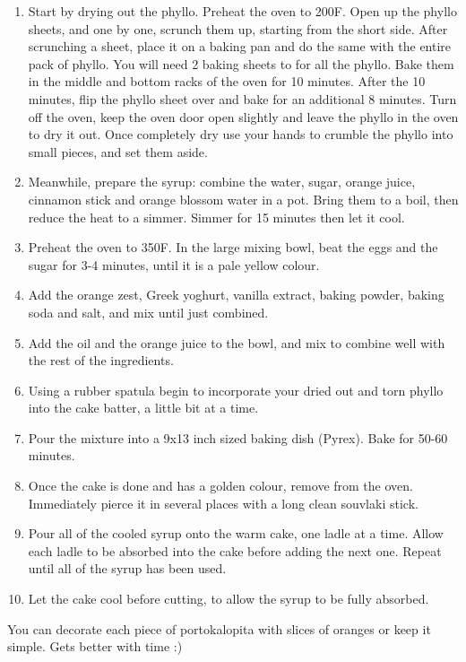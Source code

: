 \begin{enumerate}
    \item Start by drying out the phyllo. Preheat the oven to 200\degree F. Open up the phyllo sheets, and one by one, scrunch them up, starting from the short side. After scrunching a sheet, place it on a baking pan and do the same with the entire pack of phyllo. You will need 2 baking sheets to for all the phyllo. Bake them in the middle and bottom racks of the oven for 10 minutes. After the 10 minutes, flip the phyllo sheet over and bake for an additional 8 minutes. Turn off the oven, keep the oven door open slightly and leave the phyllo in the oven to dry it out. Once completely dry use your hands to crumble the phyllo into small pieces, and set them aside.
    \item Meanwhile, prepare the syrup: combine the water, sugar, orange juice, cinnamon stick and orange blossom water in a pot. Bring them to a boil, then reduce the heat to a simmer. Simmer for 15 minutes then let it cool.
    \item Preheat the oven to 350\degree F. In the large mixing bowl, beat the eggs and the sugar for 3-4 minutes, until it is a pale yellow colour.
    \item Add the orange zest, Greek yoghurt, vanilla extract, baking powder, baking soda and salt, and mix until just combined.
    \item Add the oil and the orange juice to the bowl, and mix to combine well with the rest of the ingredients.
    \item Using a rubber spatula begin to incorporate your dried out and torn phyllo into the cake batter, a little bit at a time.
    \item Pour the mixture into a 9x13 inch sized baking dish (Pyrex). Bake for 50-60 minutes.
    \item Once the cake is done and has a golden colour, remove from the oven. Immediately pierce it in several places with a long clean souvlaki stick.
    \item Pour all of the cooled syrup onto the warm cake, one ladle at a time. Allow each ladle to be absorbed into the cake before adding the next one. Repeat until all of the syrup has been used.
    \item Let the cake cool before cutting, to allow the syrup to be fully absorbed.
\end{enumerate}

You can decorate each piece of portokalopita with slices of oranges or keep it simple. Gets better with time :)


